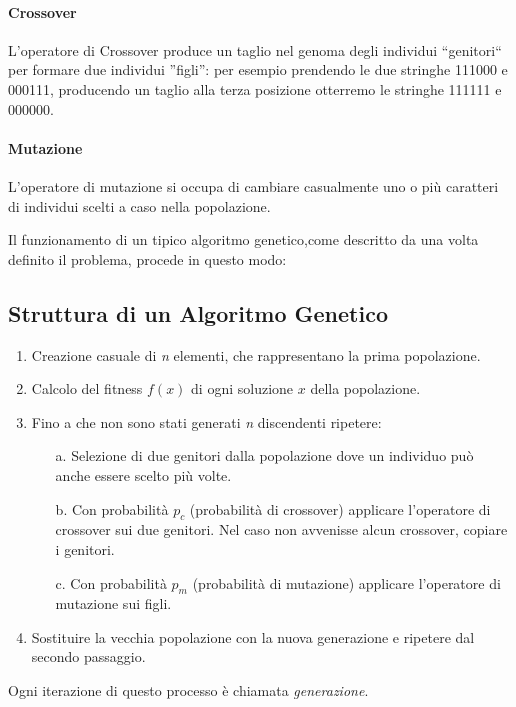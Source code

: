 \documentclass[12pt,a4paper]{report}
\begin{document}
\paragraph{Crossover} L'operatore di Crossover produce un taglio nel genoma degli individui ``genitori`` per formare due individui ''figli'': per esempio prendendo le due stringhe 111000 e 000111, producendo un taglio alla terza posizione otterremo le stringhe  111111 e 000000.

\paragraph{Mutazione} L'operatore di mutazione si occupa di cambiare casualmente uno o più caratteri di individui scelti a caso nella popolazione.

Il funzionamento di un tipico algoritmo genetico,come descritto da \cite{genetic-algorithm-mitchell} una volta definito il problema,  procede in questo modo:

\subsection{Struttura di un Algoritmo Genetico}

\begin{enumerate}
 \item Creazione casuale di \textit{n} elementi, che rappresentano la prima popolazione. 
 \item Calcolo del fitness $f(x)$ di ogni soluzione $x$ della popolazione.
 \item Fino a che non sono stati generati \textit{n} discendenti ripetere:
 \begin{enumerate}
  \item[a.] Selezione di due genitori dalla popolazione dove un individuo può anche essere scelto più volte.
  \item[b.] Con probabilità $p_{c}$ (probabilità di crossover) applicare l'operatore di crossover sui due genitori. Nel caso non avvenisse alcun crossover, copiare i genitori.
  \item[c.] Con probabilità $p_{m}$ (probabilità di mutazione) applicare l'operatore di mutazione sui figli.
 \end{enumerate}
 \item Sostituire la vecchia popolazione con la nuova generazione e ripetere dal secondo passaggio.
\end{enumerate}

Ogni iterazione di questo processo è chiamata \textit{generazione}.
\end{document}
